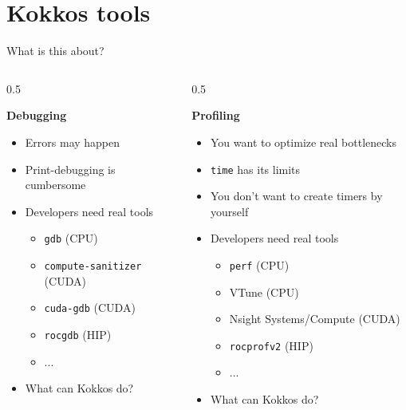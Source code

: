 \documentclass[
    aspectratio=169,
]{beamer}
\begin{document}
\section{Kokkos tools}

\begin{frame}{What is this about?}
    \begin{columns}[T]
        \begin{column}{0.5\linewidth}
            \begin{center}
                \textbf{Debugging}
            \end{center}
            \begin{itemize}
                \item Errors may happen
                \item Print-debugging is cumbersome
                \item Developers need real tools
                \begin{itemize}
                    \item \texttt{gdb} (CPU)
                    \item \texttt{compute-sanitizer} (CUDA)
                    \item \texttt{cuda-gdb} (CUDA)
                    \item \texttt{rocgdb} (HIP)
                    \item ...
                \end{itemize}
                \item What can Kokkos do?
            \end{itemize}
        \end{column}
        \pause
        \begin{column}{0.5\linewidth}
            \begin{center}
                \textbf{Profiling}
            \end{center}
            \begin{itemize}
                \item You want to optimize real bottlenecks
                \item \texttt{time} has its limits
                \item You don't want to create timers by yourself
                \item Developers need real tools
                \begin{itemize}
                    \item \texttt{perf} (CPU)
                    \item VTune (CPU)
                    \item Nsight Systems/Compute (CUDA)
                    \item \texttt{rocprofv2} (HIP)
                    \item ...
                \end{itemize}
                \item What can Kokkos do?
            \end{itemize}
        \end{column}
    \end{columns}
\end{frame}
\end{document}
